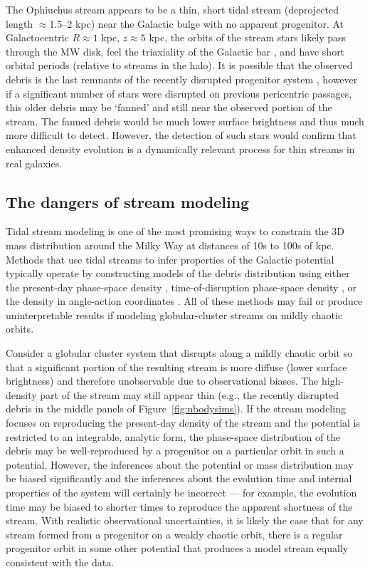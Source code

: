 \documentclass[letterpaper,12pt,preprint]{aastex}
\begin{document}
The Ophiuchus stream \citep{bernard14, sesar15} appears to be a thin, short tidal stream (deprojected length $\approx$1.5--2 kpc) near the Galactic bulge with no apparent progenitor. At Galactocentric $R \approx 1$ kpc, $z \approx 5$ kpc, the orbits of the stream stars likely pass through the MW disk, feel the triaxiality of the Galactic bar \citep[e.g.,][]{wegg13, wegg15}, and have short orbital periods (relative to streams in the halo). It is possible that the observed debris is the last remnants of the recently disrupted progenitor system \citep{sesar15}, however if a significant number of stars were disrupted on previous pericentric passages, this older debris may be `fanned' and still near the observed portion of the stream. The fanned debris would be much lower surface brightness and thus much more difficult to detect. However, the detection of such stars would confirm that enhanced density evolution is a dynamically relevant process for thin streams in real galaxies.

\subsection{The dangers of stream modeling}

Tidal stream modeling is one of the most promising ways to constrain the 3D mass distribution around the Milky Way at distances of 10s to 100s of kpc. Methods that use tidal streams to infer properties of the Galactic potential typically operate by constructing models of the debris distribution using either the present-day phase-space density \citep[e.g.,][]{kuepper12, kuepper15, amorisco and others}, time-of-disruption phase-space density \citep{apw13, apw14}, or the density in angle-action coordinates \citep{sanders14, bovy14}. All of these methods may fail or produce uninterpretable results if modeling globular-cluster streams on mildly chaotic orbits. 

Consider a globular cluster system that disrupts along a mildly chaotic orbit so that a significant portion of the resulting stream is more diffuse (lower surface brightness) and therefore unobservable due to observational biases. The high-density part of the stream may still appear thin (e.g., the recently disrupted debris in the middle panels of Figure~\ref{fig:nbodysims}). If the stream modeling focuses on reproducing the present-day density of the stream and the potential is restricted to an integrable, analytic form, the phase-space distribution of the debris may be well-reproduced by a progenitor on a particular orbit in such a potential. However, the inferences about the potential or mass distribution may be biased significantly and the inferences about the evolution time and internal properties of the system will certainly be incorrect --- for example, the evolution time may be biased to shorter times to reproduce the apparent shortness of the stream. With realistic observational uncertainties, it is likely the case that for any stream formed from a progenitor on a weakly chaotic orbit, there is a regular progenitor orbit in some other potential that produces a model stream equally consistent with the data. 
\end{document}

